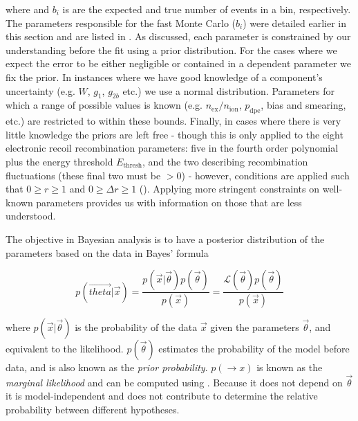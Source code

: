 \noindent where \bhi and $b_i$ is are the expected and true number of events in a bin, respectively.  The parameters responsible
for the fast Monte Carlo ($\hat{b}_i$) were detailed earlier in this section and are listed in
.  As discussed, each parameter is constrained by our understanding before
the fit using a prior distribution.  For the cases where we expect the error to be either negligible or contained in a dependent parameter
we fix the prior.  In instances where we have good knowledge of a component's uncertainty (e.g. $W$, $g_1$, $g_{2b}$ etc.) we use a normal
distribution.  Parameters for which a range of possible values is known (e.g. $n_{\mathrm{ex}} / n_{\mathrm{ion}}$, $p_{\mathrm{dpe}}$,
bias and smearing, etc.) are restricted to within these bounds.  Finally, in cases where there is very little knowledge the priors
are left free - though this is only applied to the eight electronic recoil recombination parameters: five in the fourth order polynomial
plus the energy threshold $E_{\mathrm{thresh}}$, and the two describing recombination fluctuations (these final two must be
$> 0$) - however, conditions are applied such that $0 \geq r \geq 1$ and $0 \geq \Delta r \geq 1$
().  Applying more stringent constraints on well-known parameters provides us
with information on those that are less understood.

The objective in Bayesian analysis is to have a posterior distribution of the parameters based on the data in Bayes' formula

\begin{equation}
p(\overrightarrow{theta}|\overrightarrow{x}) = \frac{p(\overrightarrow{x}|\overrightarrow{\theta})
p(\overrightarrow{\theta})}{p(\overrightarrow{x})} = \frac{\mathcal{L}(\overrightarrow{\theta})
p(\overrightarrow{\theta})}{p(\overrightarrow{x})}
\end{equation}

\noindent where $p(\overrightarrow{x}|\overrightarrow{\theta})$ is the probability of the data $\overrightarrow{x}$ given the parameters
$\overrightarrow{\theta}$, and equivalent to the likelihood.  $p(\overrightarrow{\theta})$ estimates the probability of the
model before data, and is also known as the \textit{prior probability}.  $p(\rightarrow{x})$ is known as the \textit{marginal likelihood}
and can be computed using .  Because it does not depend on
$\overrightarrow{\theta}$ it is model-independent and does not contribute to determine the relative probability between different
hypotheses.

